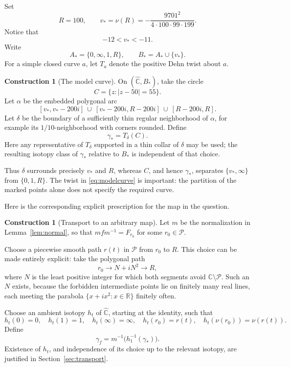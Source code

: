 \documentclass[11pt]{article}
\newcommand{\C}{\mathbb C}
\newcommand{\Sphere}{\widehat{\mathbb C}}
\newcommand{\Par}{\mathcal P}
\theoremstyle{definition}
\newtheorem{construction}[theorem]{Construction}
\theoremstyle{remark}
\begin{document}
Set
\[
R=100,\qquad
v_*=\nu(R)=-\frac{9701^2}{4\cdot100\cdot99\cdot199}.
\]
Notice that
\begin{equation}\label{eq:vbound}
-12<v_*<-11.
\end{equation}
Write
\[
A_*=\{0,\infty,1,R\},\qquad B_*=A_*\cup\{v_*\}.
\]
For a simple closed curve $a$, let $T_a$ denote the positive Dehn twist
about $a$.

\begin{construction}[The model curve]\label{con:model}
On $(\Sphere,B_*)$, take the circle
\[
C=\{z:|z-50|=55\}.
\]
Let $\alpha$ be the embedded polygonal arc
\[
[v_*,v_*-200i]\ \cup\
[v_*-200i,R-200i]\ \cup\
[R-200i,R].
\]
Let $\delta$ be the boundary of a sufficiently thin regular
neighborhood of $\alpha$, for example its $1/10$-neighborhood with
corners rounded.  Define
\begin{equation}\label{eq:modelcurve}
\boxed{\ \gamma_*=T_\delta(C).\ }
\end{equation}
Here any representative of $T_\delta$ supported in a thin collar of
$\delta$ may be used; the resulting isotopy class of $\gamma_*$
relative to $B_*$ is independent of that choice.
\end{construction}

Thus $\delta$ surrounds precisely $v_*$ and $R$, whereas $C$, and hence
$\gamma_*$, separates $\{v_*,\infty\}$ from $\{0,1,R\}$.
The twist in \eqref{eq:modelcurve} is important: the partition of the
marked points alone does not specify the required curve.

Here is the corresponding explicit prescription for the map in the
question.

\begin{construction}[Transport to an arbitrary map]\label{con:general}
Let $m$ be the normalization in Lemma~\ref{lem:normal}, so that
$mfm^{-1}=F_{r_0}$ for some $r_0\in\Par$.

Choose a piecewise smooth path $r(t)$ in $\Par$ from $r_0$ to $R$.
This choice can be made entirely explicit: take the polygonal path
\[
r_0\longrightarrow N+iN^2\longrightarrow R,
\]
where $N$ is the least positive integer for which both segments avoid
$\C\setminus\Par$.  Such an $N$ exists, because the forbidden
intermediate points lie on finitely many real lines, each meeting
the parabola $\{x+ix^2:x\in\mathbb R\}$ finitely often.

Choose an ambient isotopy $h_t$ of $\Sphere$, starting at the identity,
such that
\[
h_t(0)=0,\quad h_t(1)=1,\quad h_t(\infty)=\infty,\quad
h_t(r_0)=r(t),\quad h_t(\nu(r_0))=\nu(r(t)).
\]
Define
\begin{equation}\label{eq:generalcurve}
\boxed{\ \gamma_f=m^{-1}\bigl(h_1^{-1}(\gamma_*)\bigr).\ }
\end{equation}
Existence of $h_t$, and independence of its choice up to the relevant
isotopy, are justified in Section~\ref{sec:transport}.
\end{construction}
\end{document}

